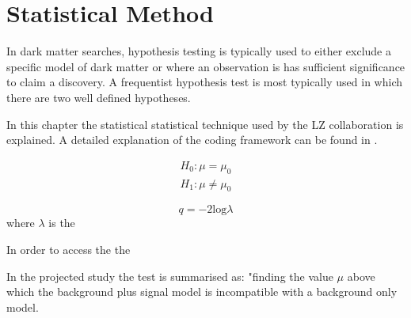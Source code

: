 \section{Statistical Method}
\par
In dark matter searches, hypothesis testing is typically used to either exclude a specific model of dark matter or where an observation is has sufficient significance to claim a discovery.
A frequentist hypothesis test is most typically used in which there are two well defined hypotheses.


In this chapter the statistical statistical technique used by the LZ collaboration is explained.
A detailed explanation of the coding framework can be found in \cite{LZ_Ibles_LZStats_Thesis_ref}.



\begin{equation}
    \begin{split}
        H_0: \mu = \mu_0 \\
        H_1: \mu \neq \mu_0
    \end{split}
\end{equation}

\begin{equation}
    q = -2 \text{log}\lambda
\end{equation}
where $\lambda$ is the 

In order to access the the 

\par
In the projected study the test is summarised as:
"finding the value $\mu$ above which the background plus signal model is incompatible with a background only model.